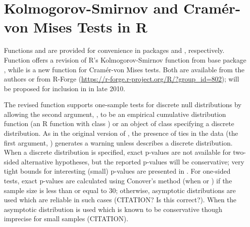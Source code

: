\section{Kolmogorov-Smirnov and Cram\'{e}r-von Mises Tests in R}

Functions  and  are provided for
convenience in packages  and , respectively.
Function  offers a revision of
R's Kolmogorov-Smirnov function  from base
package , while  is a new
function for Cram\'{e}r-von Mises tests.
Both are available from the authors
or from R-Forge (\url{https://r-forge.r-project.org/R/?group_id=802});
 will be proposed for inclusion in  in late 2010.

The revised  function supports one-sample tests for discrete
null distributions by allowing the second argument, , to be
an empirical cumulative distribution function (an R function
with class ) or an object of class  specifying
a discrete distribution.  As in the original version of ,
the presence of ties in the data (the first argument, ) generates a
warning unless  describes a discrete distribution.  When a discrete
distribution is specified, exact p-values are not available for 
two-sided alternative hypotheses, but the reported p-values will be
conservative; very tight bounds for interesting (small) p-values are
presented in \cite{Conover1972}.  For one-sided tests,
exact p-values are calculated using Conover's
method (when  or )
if the sample size is less than or equal to 30; otherwise, asymptotic distributions
are used which are reliable in such cases (CITATION? Is this correct?).
When  the asymptotic distribution is used which is known
to be conservative though imprecise for small samples (CITATION).


